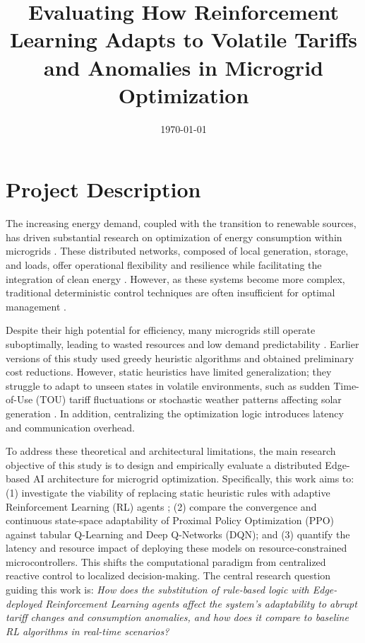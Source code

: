 \documentclass[conference]{IEEEtran}
\title{Evaluating How Reinforcement Learning Adapts to Volatile Tariffs and Anomalies in Microgrid Optimization}
\author{
\IEEEauthorblockA{Creative Experience: Transformative Project II\\
Bachelor’s in Computer Science -- PUCPR
\\[3ex]
Class \red{X} -- Team \red{N} \\
Tarso Bertolini, Eduardo Contin, Giancarlo, Paulo, Bell \\
{\tt\small \{\red{tarso.bertolini}, \red{contin.eduardo}\}@pucpr.edu.br}
}
}
\date{\today}
\begin{document}
\maketitle

\section{Project Description}
\label{sec:intro}

The increasing energy demand, coupled with the transition to renewable sources, has driven substantial research on optimization of energy consumption within microgrids \cite{hua2019}. These distributed networks, composed of local generation, storage, and loads, offer operational flexibility and resilience while facilitating the integration of clean energy \cite{liu2020}. However, as these systems become more complex, traditional deterministic control techniques are often insufficient for optimal management \cite{lu2019}.

Despite their high potential for efficiency, many microgrids still operate suboptimally, leading to wasted resources and low demand predictability \cite{zhang2021}. Earlier versions of this study used greedy heuristic algorithms and obtained preliminary cost reductions. However, static heuristics have limited generalization; they struggle to adapt to unseen states in volatile environments, such as sudden Time-of-Use (TOU) tariff fluctuations or stochastic weather patterns affecting solar generation \cite{wang2022}. In addition, centralizing the optimization logic introduces latency and communication overhead.

To address these theoretical and architectural limitations, the main research objective of this study is to design and empirically evaluate a distributed Edge-based AI architecture for microgrid optimization. Specifically, this work aims to: (1) investigate the viability of replacing static heuristic rules with adaptive Reinforcement Learning (RL) agents \cite{chen2023}; (2) compare the convergence and continuous state-space adaptability of Proximal Policy Optimization (PPO) against tabular Q-Learning and Deep Q-Networks (DQN); and (3) quantify the latency and resource impact of deploying these models on resource-constrained microcontrollers. This shifts the computational paradigm from centralized reactive control to localized decision-making. The central research question guiding this work is: \textit{How does the substitution of rule-based logic with Edge-deployed Reinforcement Learning agents affect the system's adaptability to abrupt tariff changes and consumption anomalies, and how does it compare to baseline RL algorithms in real-time scenarios?}
\end{document}
